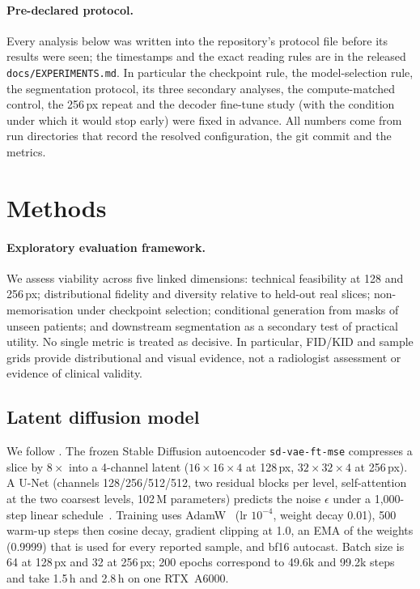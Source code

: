 \documentclass[10pt,a4paper]{article}
\begin{document}
\paragraph{Pre-declared protocol.} Every analysis below was written into the repository's protocol file before its results were seen; the timestamps and the exact reading rules are in the released \texttt{docs/EXPERIMENTS.md}. In particular the checkpoint rule, the model-selection rule, the segmentation protocol, its three secondary analyses, the compute-matched control, the 256\,px repeat and the decoder fine-tune study (with the condition under which it would stop early) were fixed in advance. All numbers come from run directories that record the resolved configuration, the git commit and the metrics.

\section{Methods}
\label{sec:methods}
\paragraph{Exploratory evaluation framework.} We assess viability across five linked dimensions: technical feasibility at 128 and 256\,px; distributional fidelity and diversity relative to held-out real slices; non-memorisation under checkpoint selection; conditional generation from masks of unseen patients; and downstream segmentation as a secondary test of practical utility. No single metric is treated as decisive. In particular, FID/KID and sample grids provide distributional and visual evidence, not a radiologist assessment or evidence of clinical validity.

\subsection{Latent diffusion model}
We follow \citet{rombach2022ldm}. The frozen Stable Diffusion autoencoder \texttt{sd-vae-ft-mse} compresses a slice by $8\times$ into a 4-channel latent ($16\times16\times4$ at 128\,px, $32\times32\times4$ at 256\,px). A U-Net (channels 128/256/512/512, two residual blocks per level, self-attention at the two coarsest levels, 102\,M parameters) predicts the noise $\epsilon$ under a 1,000-step linear schedule~\citep{ho2020ddpm}. Training uses AdamW~\citep{loshchilov2019adamw} (lr $10^{-4}$, weight decay 0.01), 500 warm-up steps then cosine decay, gradient clipping at 1.0, an EMA of the weights (0.9999) that is used for every reported sample, and bf16 autocast. Batch size is 64 at 128\,px and 32 at 256\,px; 200 epochs correspond to 49.6k and 99.2k steps and take 1.5\,h and 2.8\,h on one RTX~A6000.
\end{document}
